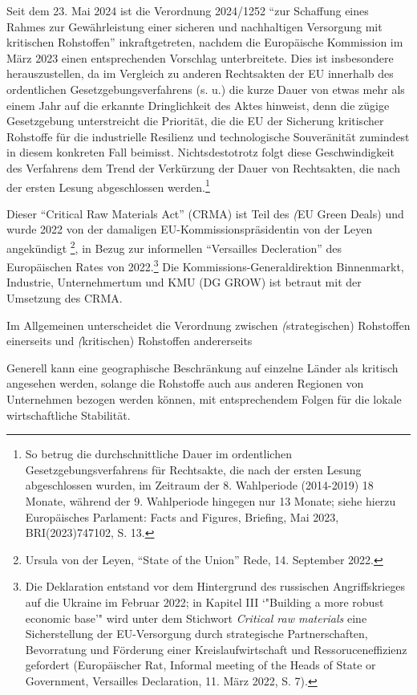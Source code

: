 \documentclass[12pt,a4paper,oneside]{book} %
\begin{document}
{	Seit dem 23. Mai 2024 ist die Verordnung 2024/1252 "`zur Schaffung eines Rahmes zur Gewährleistung einer sicheren und nachhaltigen Versorgung mit kritischen Rohstoffen"' inkraftgetreten, nachdem die Europäische Kommission im März 2023 einen entsprechenden Vorschlag unterbreitete. Dies ist insbesondere herauszustellen, da im Vergleich zu anderen Rechtsakten der EU innerhalb des ordentlichen Gesetzgebungsverfahrens (s. u.) die kurze Dauer von etwas mehr als einem Jahr auf die erkannte Dringlichkeit des Aktes hinweist, denn die zügige Gesetzgebung unterstreicht die Priorität, die die EU der Sicherung kritischer Rohstoffe für die industrielle Resilienz und technologische Souveränität zumindest in diesem konkreten Fall beimisst. Nichtsdestotrotz folgt diese Geschwindigkeit des Verfahrens dem Trend der Verkürzung der Dauer von Rechtsakten, die nach der ersten Lesung abgeschlossen werden.\footnote{So betrug die durchschnittliche Dauer im ordentlichen Gesetzgebungsverfahrens für Rechtsakte, die nach der ersten Lesung abgeschlossen wurden, im Zeitraum der 8. Wahlperiode (2014-2019) 18 Monate, während der 9. Wahlperiode hingegen nur 13 Monate; siehe hierzu Europäisches Parlament: Facts and Figures, Briefing, Mai 2023, BRI(2023)747102, S. 13.} 
	
	
	Dieser "`Critical Raw Materials Act"' (CRMA) ist Teil des \textit(EU Green Deals) und wurde 2022 von der damaligen EU-Kommissionspräsidentin von der Leyen angekündigt \footnote{Ursula von der Leyen, "`State of the Union"' Rede, 14. September 2022.}, in Bezug zur informellen "`Versailles Decleration"' des Europäischen Rates von 2022.\footnote{Die Deklaration entstand vor dem Hintergrund des russischen Angriffskrieges auf die Ukraine im Februar 2022; in Kapitel III `"Building a more robust economic base'" wird unter dem Stichwort \textit{Critical raw materials} eine Sicherstellung der EU-Versorgung durch strategische Partnerschaften, Bevorratung und Förderung einer Kreislaufwirtschaft und Ressoruceneffizienz gefordert (Europäischer Rat, Informal meeting of the Heads of State or Government, Versailles Declaration, 11. März 2022, S. 7).} Die Kommissions-Generaldirektion Binnenmarkt, Industrie, Unternehmertum und KMU (DG GROW) ist betraut mit der Umsetzung des CRMA.
	
	Im Allgemeinen unterscheidet die Verordnung zwischen \textit(strategischen) Rohstoffen einerseits und \textit(kritischen) Rohstoffen andererseits
	
	Generell kann eine geographische Beschränkung auf einzelne Länder als kritisch angesehen werden, solange die Rohstoffe auch aus anderen Regionen von Unternehmen bezogen werden können, mit entsprechendem Folgen für die lokale wirtschaftliche Stabilität.\autocite[s. hierzu]{ruettinger_doddfrank_2015}
	
}
\end{document}
